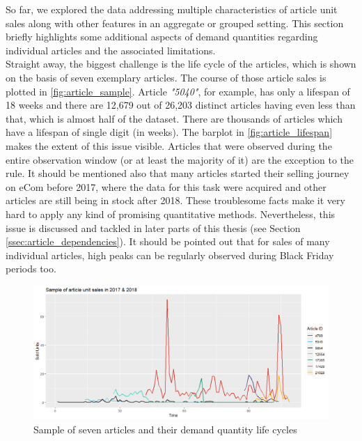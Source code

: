 

So far, we explored the data addressing multiple characteristics of article unit sales along with other features in an aggregate or grouped setting. This section briefly highlights some additional aspects of demand quantities regarding individual articles and the associated limitations.
\\

Straight away, the biggest challenge is the life cycle of the articles, which is shown on the basis of seven exemplary articles. The course of those article sales is plotted in \autoref{fig:article_sample}. Article \textit{"5040"}, for example, has only a lifespan of 18 weeks and there are 12,679 out of 26,203 distinct articles having even less than that, which is almost half of the dataset. There are thousands of articles which have a lifespan of single digit (in weeks). The barplot in \autoref{fig:article_lifespan} makes the extent of this issue visible. Articles that were observed during the entire observation window (or at least the majority of it) are the exception to the rule. It should be mentioned also that many articles started their selling journey on eCom before 2017, where the data for this task were acquired and other articles are still being in stock after 2018. These troublesome facts make it very hard to apply any kind of promising quantitative methods. Nevertheless, this issue is discussed and tackled in later parts of this thesis (see Section \ref{ssec:article_dependencies}). It should be pointed out that for sales of many individual articles, high peaks can be regularly observed during Black Friday periods too.
\\


\begin{figure}[H]
\centering
  \includegraphics[width=0.95\linewidth]{figures/article_sample.png}
  \caption{Sample of seven articles and their demand quantity life cycles}
  \label{fig:article_sample}
\end{figure}


